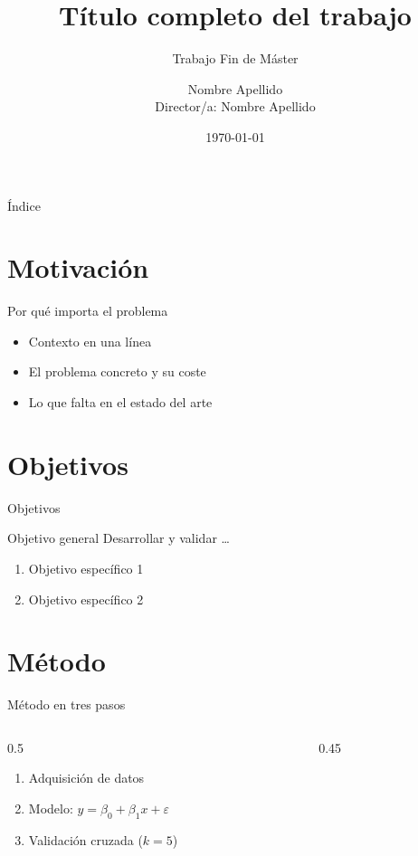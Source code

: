 \documentclass[aspectratio=169,11pt]{beamer}
\title[Título corto]{Título completo del trabajo}
\subtitle{Trabajo Fin de Máster}
\author[N. Apellido]{Nombre Apellido\\ \small Director/a: Nombre Apellido}
\institute[Universidad]{Escuela / Departamento\\ Universidad}
\date{\today}
\begin{document}
\begin{frame}
  \titlepage
\end{frame}

\begin{frame}{Índice}
  \tableofcontents
\end{frame}

\section{Motivación}
\begin{frame}{Por qué importa el problema}
  \begin{itemize}
    \item Contexto en una línea
    \item El problema concreto y su coste
    \item<2-> Lo que falta en el estado del arte
  \end{itemize}
\end{frame}

\section{Objetivos}
\begin{frame}{Objetivos}
  \begin{block}{Objetivo general}
    Desarrollar y validar \dots
  \end{block}
  \begin{enumerate}
    \item Objetivo específico 1
    \item Objetivo específico 2
  \end{enumerate}
\end{frame}

\section{Método}
\begin{frame}{Método en tres pasos}
  \begin{columns}[T]
    \begin{column}{0.5\textwidth}
      \begin{enumerate}
        \item Adquisición de datos
        \item Modelo: $y = \beta_0 + \beta_1 x + \varepsilon$
        \item Validación cruzada ($k=5$)
      \end{enumerate}
    \end{column}
    \begin{column}{0.45\textwidth}
      \centering
      \fbox{\rule{0pt}{3cm}\rule{0.8\linewidth}{0pt}}
    \end{column}
  \end{columns}
\end{frame}
\end{document}
